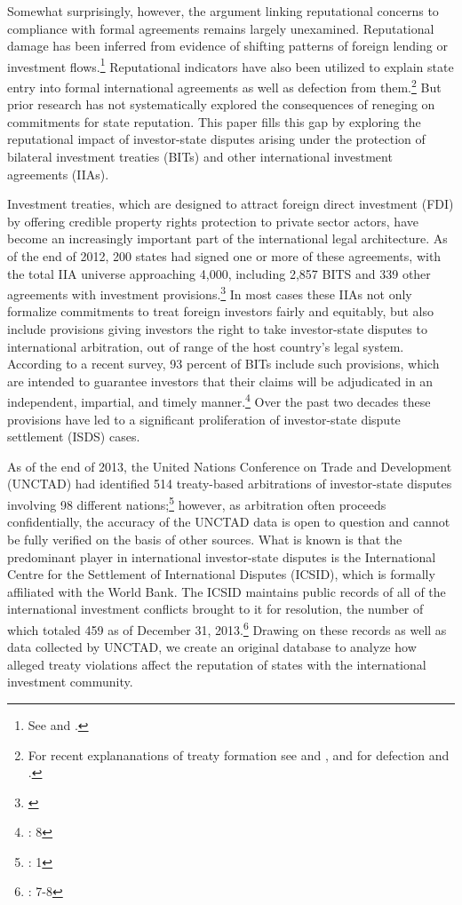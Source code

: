 \documentclass[12pt,onesided]{amsart}
\begin{document}
Somewhat surprisingly, however, the argument linking reputational concerns to compliance with formal agreements remains largely unexamined. Reputational damage has been inferred from evidence of shifting patterns of foreign lending or investment flows.\footnote{See \citet{tomz:2007} and \citet{allee:peinhardt:2011}.} Reputational indicators have also been utilized to explain state entry into formal international agreements as well as defection from them.\footnote{For recent explananations of treaty formation see \citet{elkins:etal:2006} and \citet{simmons:danner:2010}, and for defection \citet{allee:peinhardt:2011} and \citet{freeman:2013}.}  But prior research has not systematically explored the consequences of reneging on commitments for state reputation. This paper fills this gap by exploring the reputational impact of investor-state disputes arising under the protection of bilateral investment treaties (BITs) and other international investment agreements (IIAs).

Investment treaties, which are designed to attract foreign direct investment (FDI) by offering credible property rights protection to private sector actors, have become an increasingly important part of the international legal architecture. As of the end of 2012, 200 states had signed one or more of these agreements, with the total IIA universe approaching 4,000, including 2,857 BITS and 339 other agreements with investment provisions.\footnote{\citet{unctad:2013}} In most cases these IIAs not only formalize commitments to treat foreign investors fairly and equitably, but also include provisions giving investors the right to take investor-state disputes to international arbitration, out of range of the host country's legal system. According to a recent survey, 93 percent of BITs include such provisions, which are intended to guarantee investors that their claims will be adjudicated in an independent, impartial, and timely manner.\footnote{\citet{gaukordger:gordon:2012}: 8} Over the past two decades these provisions have led to a significant proliferation of investor-state dispute settlement (ISDS) cases.

As of the end of 2013, the United Nations Conference on Trade and Development (UNCTAD) had identified 514 treaty-based arbitrations of investor-state disputes involving 98 different nations;\footnote{\citet{unctad:2014}: 1} however, as arbitration often proceeds confidentially, the accuracy of the UNCTAD data is open to question and cannot be fully verified on the basis of other sources. What is known is that the predominant player in international investor-state disputes is the International Centre for the Settlement of International Disputes (ICSID), which is formally affiliated with the World Bank. The ICSID maintains public records of all of the international investment conflicts brought to it for resolution, the number of which totaled 459 as of December 31, 2013.\footnote{\citet{icsid:2014}: 7-8} Drawing on these records as well as data collected by UNCTAD, we create an original database to analyze how alleged treaty violations affect the reputation of states with the international investment community. 
\end{document}
